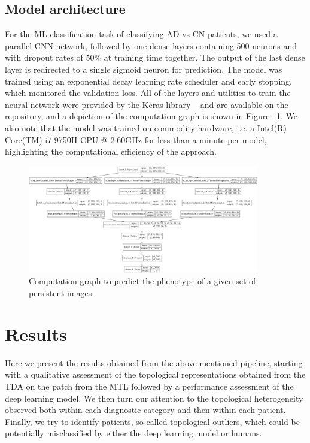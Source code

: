 \documentclass{article}
\begin{document}
\subsection{Model architecture}
For the ML classification task of classifying AD vs CN patients, we used a parallel CNN network, followed by one dense layers containing 500 neurons and with dropout rates of 50\% at training time together. The output of the last dense layer is redirected to a single sigmoid neuron for prediction. The model was trained using an exponential decay learning rate scheduler and early stopping, which monitored the validation loss. All of the layers and utilities to train the neural network were provided by the Keras library ~\citep{chollet2015keras} and are available on the \href{https://github.com/pjhartout/TDA_ADNI_MLCB}{repository}, and a depiction of the computation graph is shown in Figure ~\ref{fig:model_arch}. We also note that the model was trained on commodity hardware, i.e. a Intel(R) Core(TM) i7-9750H CPU @ 2.60GHz for less than a minute per model, highlighting the computational efficiency of the approach.

\begin{figure}
  \centering
  \includegraphics[width=0.9\textwidth]{figures/model.png}
  \caption{Computation graph to predict the phenotype of a given set of persistent images.}
  \label{fig:model_arch}
\end{figure}

\section{Results}\label{sec:results}

Here we present the results obtained from the above-mentioned pipeline, starting with a qualitative assessment of the topological representations obtained from the TDA on the patch from the MTL followed by a performance assessment of the deep learning model. We then turn our attention to the topological heterogeneity observed both within each diagnostic category and then within each patient. Finally, we try to identify patients, so-called topological outliers, which could be potentially misclassified by either the deep learning model or humans.
\end{document}
